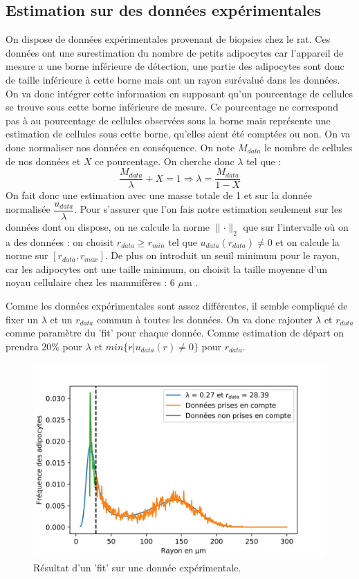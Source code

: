 \documentclass[a4paper,fleqn,leqno]{article}
\begin{document}
\newpage

\subsection{Estimation sur des données expérimentales}

On dispose de données expérimentales provenant de biopsies chez le rat. Ces données ont une surestimation du nombre de petits adipocytes car l'appareil de mesure a une borne inférieure de détection, une partie des adipocytes sont donc de taille inférieure à cette borne mais ont un rayon surévalué dans les données. On va donc intégrer cette information en supposant qu'un pourcentage de cellules se trouve sous cette borne inférieure de mesure. Ce pourcentage ne correspond pas à au pourcentage de cellules observées sous la borne mais représente une estimation de cellules sous cette borne, qu'elles aient été comptées ou non. On va donc normaliser nos données en conséquence.
On note $M_{data}$ le nombre de cellules de nos données et $X$ ce pourcentage. On cherche donc $\lambda$ tel que :
\[\dfrac{M_{data}}{\lambda} + X = 1 \Rightarrow \lambda = \dfrac{M_{data}}{1 - X}\]
On fait donc une estimation avec une masse totale de 1 et sur la donnée normalisée $\dfrac{u_{data}}{\lambda}$. Pour s'assurer que l'on fais notre estimation seulement sur les données dont on dispose, on ne calcule la norme $\lVert \cdot \rVert_2$ que sur l'intervalle où on a des données : on choisit $r_{data} \geq r_{min}$ tel que $u_{data}(r_{data}) \neq 0$ et on calcule la norme sur $[r_{data},r_{max}]$. De plus on introduit un seuil minimum pour le rayon, car les adipocytes ont une taille minimum, on choisit la taille moyenne d'un noyau cellulaire chez les mammifères : 6 $\mu$m \cite{Cell}.

Comme les données expérimentales sont assez différentes, il semble compliqué de fixer un $\lambda$ et un $r_{data}$ commun à toutes les données. On va donc rajouter $\lambda$ et $r_{data}$ comme paramètre du 'fit' pour chaque donnée. Comme estimation de départ on prendra 20\% pour $\lambda$ et $min\{r | u_{data}(r) \neq 0\}$ pour $r_{data}$.

\begin{figure}[H]
\centering
\includegraphics[scale=1]{Hys-D0-5-1}
\caption{Résultat d'un 'fit' sur une donnée expérimentale.}
\label{figure:4}
\end{figure}
\end{document}
